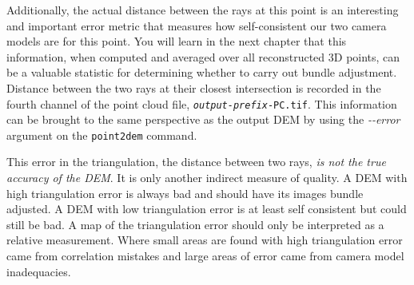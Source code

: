 Additionally, the actual distance between the rays at this point is an
interesting and important error metric that measures how
self-consistent our two camera models are for this point.  You will
learn in the next chapter that this information, when computed and
averaged over all reconstructed 3D points, can be a valuable statistic
for determining whether to carry out bundle adjustment. Distance
between the two rays at their closest intersection is recorded in the
fourth channel of the point cloud file,
\texttt{\textit{output-prefix}-PC.tif}. This information can be
brought to the same perspective as the output DEM by using the
\textit{-\/-error} argument on the \texttt{point2dem} command.

This error in the triangulation, the distance between two rays,
\emph{is not the true accuracy of the DEM}. It is only another
indirect measure of quality. A DEM with high triangulation error
is always bad and should have its images bundle adjusted. A DEM
with low triangulation error is at least self consistent but could
still be bad. A map of the triangulation error should only be
interpreted as a relative measurement. Where small areas are found
with high triangulation error came from correlation mistakes and
large areas of error came from camera model inadequacies.
